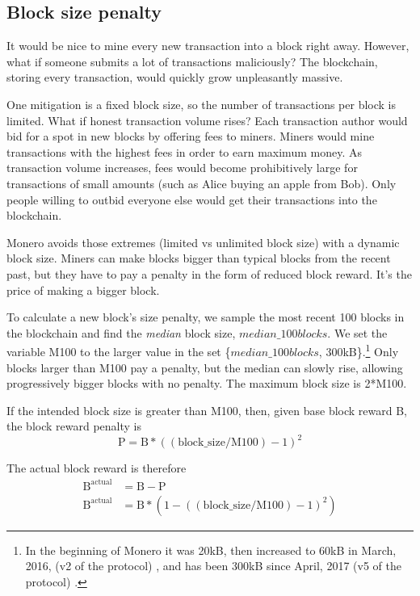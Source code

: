 \subsection{Block size penalty}
\label{subsec:penalty}

It would be nice to mine every new transaction into a block right away. However, what if someone submits a lot of transactions maliciously? The blockchain, storing every transaction, would quickly grow unpleasantly massive. 

One mitigation is a fixed block size, so the number of transactions per block is limited. What if honest transaction volume rises? Each transaction author would bid for a spot in new blocks by offering fees to miners. Miners would mine transactions with the highest fees in order to earn maximum money. As transaction volume increases, fees would become prohibitively large for transactions of small amounts (such as Alice buying an apple from Bob). Only people willing to outbid everyone else would get their transactions into the blockchain.

Monero avoids those extremes (limited vs unlimited block size) with a dynamic block size. Miners can make blocks bigger than typical blocks from the recent past, but they have to pay a penalty in the form of reduced block reward. It's the price of making a bigger block.

To calculate a new block's size penalty, we sample the most recent 100 blocks in the blockchain and find the {\em median} block size, $\mathit{median\_100blocks}$. We set the variable M100 to the larger value in the set \{$\mathit{median\_100blocks}$, 300kB\}.\footnote{In the beginning of Monero it was 20kB, then increased to 60kB in March, 2016, (v2 of the protocol) \cite{monero-0.9.3}, and has been 300kB since April, 2017 (v5 of the protocol) \cite{monero-v5}.} Only blocks larger than M100 pay a penalty, but the median can slowly rise, allowing progressively bigger blocks with no penalty. The maximum block size is 2*M100.

If the intended block size is greater than M100, then, given base block reward B, the block reward penalty is
\[ \textrm{P} = \textrm{B}*((\textrm{block\_size}/\textrm{M100}) - 1)^2 \]

The actual block reward is therefore
\begin{align*}
    \textrm{B}^{\textrm{actual}} &= \textrm{B} - \textrm{P} \\
    \textrm{B}^{\textrm{actual}} &= \textrm{B}*(1-((\textrm{block\_size}/\textrm{M100}) - 1)^2)
\end{align*}

